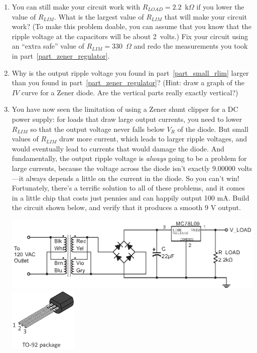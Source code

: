 \begin{enumerate}[wide]
\item You can still make your circuit work with $R_{LOAD} = 2.2$~k$\Omega$ if you lower the value of $R_{LIM}$.  What is the largest value of $R_{LIM}$ that will make your circuit work?  (To make this problem doable, you can assume that you know that the ripple voltage at the capacitors will be about 2~volts.)  Fix your circuit using an ``extra safe'' value of $R_{LIM}=330$~$\Omega$ and redo the measurements you took in part~\ref{part_zener_regulator}.  \label{part_small_rlim}

\item Why is the output ripple voltage you found in part~\ref{part_small_rlim} larger than you found in part~\ref{part_zener_regulator}?  (Hint: draw a graph of the $IV$ curve for a Zener diode.  Are the vertical parts really exactly vertical?)

\item You have now seen the limitation of using a Zener shunt clipper for a DC power supply: for loads that draw large output currents, you need to lower $R_{LIM}$ so that the output voltage never falls below $V_R$ of the diode.  But small values of $R_{LIM}$ draw more current, which leads to larger ripple voltages, and would eventually lead to currents that would damage the diode.  And fundamentally, the output ripple voltage is \textit{always} going to be a problem for large currents, because the voltage across the diode isn't exactly 9.00000 volts---it always depends a little on the current in the diode.  So you can't win!  Fortunately, there's a terrific solution to all of these problems, and it comes in a little chip that costs just pennies and can happily output 100 mA.  Build the circuit shown below, and verify that it produces a smooth 9 V output. \label{part_linear_power_supply_78xx}
\begin{center}
\includegraphics{power_supply/7809_regulator.eps}
\includegraphics[width=1.3in]{appendices/pinouts/TO-92_package_pinout.eps}
\end{center}
 

\end{enumerate}
